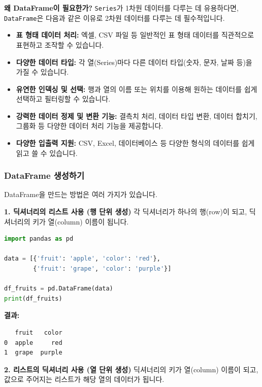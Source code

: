 \documentclass[11pt,a4paper]{book}
\theoremstyle{definition}
\begin{document}
\textbf{왜 DataFrame이 필요한가?}
\texttt{Series}가 1차원 데이터를 다루는 데 유용하다면, \texttt{DataFrame}은 다음과 같은 이유로 2차원 데이터를 다루는 데 필수적입니다.
\begin{itemize}
    \item \textbf{표 형태 데이터 처리:} 엑셀, CSV 파일 등 일반적인 표 형태 데이터를 직관적으로 표현하고 조작할 수 있습니다.
    \item \textbf{다양한 데이터 타입:} 각 열(Series)마다 다른 데이터 타입(숫자, 문자, 날짜 등)을 가질 수 있습니다.
    \item \textbf{유연한 인덱싱 및 선택:} 행과 열의 이름 또는 위치를 이용해 원하는 데이터를 쉽게 선택하고 필터링할 수 있습니다.
    \item \textbf{강력한 데이터 정제 및 변환 기능:} 결측치 처리, 데이터 타입 변환, 데이터 합치기, 그룹화 등 다양한 데이터 처리 기능을 제공합니다.
    \item \textbf{다양한 입출력 지원:} CSV, Excel, 데이터베이스 등 다양한 형식의 데이터를 쉽게 읽고 쓸 수 있습니다.
\end{itemize}

\subsubsection{DataFrame 생성하기}

DataFrame을 만드는 방법은 여러 가지가 있습니다.

\textbf{1. 딕셔너리의 리스트 사용 (행 단위 생성)}
각 딕셔너리가 하나의 행(row)이 되고, 딕셔너리의 키가 열(column) 이름이 됩니다.

\begin{codeexamplebox}
\begin{lstlisting}[language=Python, caption={딕셔너리의 리스트로 DataFrame 생성}, label={lst:df_from_list_of_dicts}, breaklines=true]
import pandas as pd

data = [{'fruit': 'apple', 'color': 'red'},
        {'fruit': 'grape', 'color': 'purple'}]

df_fruits = pd.DataFrame(data)
print(df_fruits)
\end{lstlisting}
\textbf{결과:}
\begin{verbatim}
   fruit   color
0  apple     red
1  grape  purple
\end{verbatim}
\end{codeexamplebox}

\textbf{2. 리스트의 딕셔너리 사용 (열 단위 생성)}
딕셔너리의 키가 열(column) 이름이 되고, 값으로 주어지는 리스트가 해당 열의 데이터가 됩니다.
\end{document}
